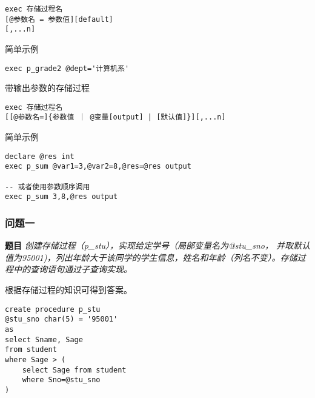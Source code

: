 \begin{mdframed}[backgroundcolor=gray!10]
\begin{verbatim}
exec 存储过程名
[@参数名 = 参数值][default]
[,...n]
\end{verbatim}
\end{mdframed}

\qquad 简单示例

\begin{mdframed}[backgroundcolor=gray!10]
\begin{verbatim}
exec p_grade2 @dept='计算机系'
\end{verbatim}
\end{mdframed}

\qquad 带输出参数的存储过程

\begin{mdframed}[backgroundcolor=gray!10]
\begin{verbatim}
exec 存储过程名
[[@参数名=]{参数值 ｜ @变量[output] | [默认值]}][,...n]
\end{verbatim}
\end{mdframed}

\qquad 简单示例

\begin{mdframed}[backgroundcolor=gray!10]
\begin{verbatim}
declare @res int
exec p_sum @var1=3,@var2=8,@res=@res output

-- 或者使用参数顺序调用
exec p_sum 3,8,@res output
\end{verbatim}
\end{mdframed}

\subsubsection{问题一}

\textbf{题目} \emph{创建存储过程（p\_stu），实现给定学号（局部变量名为@stu\_sno， 并取默认值为95001)，列出年龄大于该同学的学生信息，姓名和年龄（列名不变）。存储过程中的查询语句通过子查询实现。}

\qquad 根据存储过程的知识可得到答案。

\begin{mdframed}[backgroundcolor=blue!5]
\begin{verbatim}
create procedure p_stu
@stu_sno char(5) = '95001'
as
select Sname, Sage
from student
where Sage > (
    select Sage from student
    where Sno=@stu_sno
)
\end{verbatim}
\end{mdframed}

